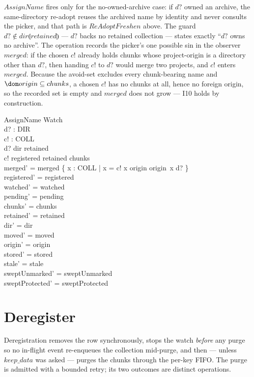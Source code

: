 \documentclass[a4paper]{article}
\begin{document}
$AssignName$ fires only for the no-owned-archive case: if $d?$ owned an archive,
the same-directory re-adopt reuses the archived name by identity and never
consults the picker, and that path is $ReAdoptFreshen$ above.  The guard $d?
\notin dir \limg retained \rimg$ --- $d?$ backs no retained collection --- states
exactly ``$d?$ owns no archive''.  The operation records the picker's one
possible sin in the observer $merged$: if the chosen $c!$ already holds chunks
whose project-origin is a directory other than $d?$, then handing $c!$ to $d?$
would merge two projects, and $c!$ enters $merged$.  Because the avoid-set
excludes every chunk-bearing name and $\dom origin \subseteq chunks$, a chosen
$c!$ has no chunks at all, hence no foreign origin, so the recorded set is empty
and $merged$ does not grow --- I10 holds by construction.

\begin{schema}{AssignName}
  \Delta Watch \\
  d? : DIR \\
  c! : COLL \\
  \where
  d? \notin dir \limg retained \rimg \\
  c! \notin registered \cup retained \cup chunks \\
  merged' = merged \cup \{ x : COLL | x = c! \land x \in \dom origin \land origin~x \neq d? \} \\
  registered' = registered \\
  watched' = watched \\
  pending' = pending \\
  chunks' = chunks \\
  retained' = retained \\
  dir' = dir \\
  moved' = moved \\
  origin' = origin \\
  stored' = stored \\
  stale' = stale \\
  sweptUnmarked' = sweptUnmarked \\
  sweptProtected' = sweptProtected
\end{schema}

\section{Deregister}

Deregistration removes the row synchronously, stops the watch \textit{before}
any purge so no in-flight event re-enqueues the collection mid-purge, and then
--- unless $keep\_data$ was asked --- purges the chunks through the per-key
FIFO.  The purge is admitted with a bounded retry; its two outcomes are distinct
operations.
\end{document}
